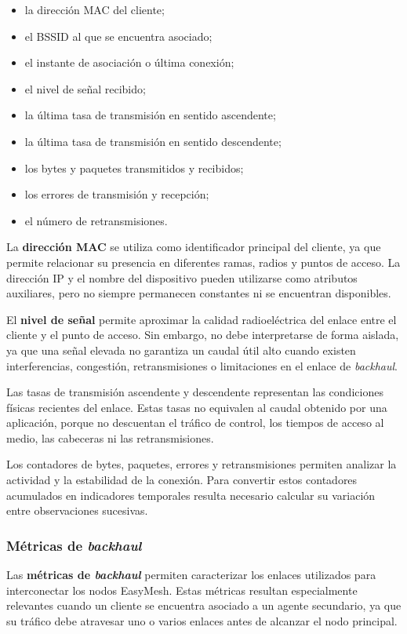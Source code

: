 \begin{itemize}
    \item la dirección MAC del cliente;
    \item el BSSID al que se encuentra asociado;
    \item el instante de asociación o última conexión;
    \item el nivel de señal recibido;
    \item la última tasa de transmisión en sentido ascendente;
    \item la última tasa de transmisión en sentido descendente;
    \item los bytes y paquetes transmitidos y recibidos;
    \item los errores de transmisión y recepción;
    \item el número de retransmisiones.
\end{itemize}

La \textbf{dirección MAC} se utiliza como identificador principal del
cliente, ya que permite relacionar su presencia en diferentes ramas,
radios y puntos de acceso. La dirección IP y el nombre del dispositivo
pueden utilizarse como atributos auxiliares, pero no siempre permanecen
constantes ni se encuentran disponibles.

El \textbf{nivel de señal} permite aproximar la calidad radioeléctrica
del enlace entre el cliente y el punto de acceso. Sin embargo, no debe
interpretarse de forma aislada, ya que una señal elevada no garantiza un
caudal útil alto cuando existen interferencias, congestión,
retransmisiones o limitaciones en el enlace de
\textit{backhaul}.

Las tasas de transmisión ascendente y descendente representan las
condiciones físicas recientes del enlace. Estas tasas no equivalen al
caudal obtenido por una aplicación, porque no descuentan el tráfico de
control, los tiempos de acceso al medio, las cabeceras ni las
retransmisiones.

Los contadores de bytes, paquetes, errores y retransmisiones permiten
analizar la actividad y la estabilidad de la conexión. Para convertir
estos contadores acumulados en indicadores temporales resulta necesario
calcular su variación entre observaciones sucesivas.

\subsubsection*{Métricas de \textit{backhaul}}

Las \textbf{métricas de \textit{backhaul}} permiten caracterizar los
enlaces utilizados para interconectar los nodos EasyMesh. Estas métricas
resultan especialmente relevantes cuando un cliente se encuentra
asociado a un agente secundario, ya que su tráfico debe atravesar uno o
varios enlaces antes de alcanzar el nodo principal.

